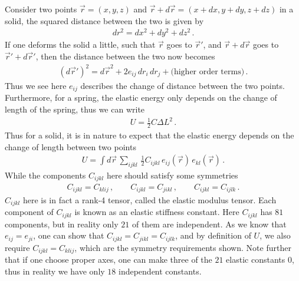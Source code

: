 \documentclass[11pt, onesided]{book}
\theoremstyle{break}
\theoremstyle{break}
\begin{document}
Consider two points $\vec{r} = (x,y,z)$ and $\vec{r}+d\vec{r} = (x+ dx, y + dy, z+dz)$ in a solid, the squared distance between the two is given by
\begin{align*}
dr^2 = dx^2 + dy^2 + dz^2\,.
\end{align*}
If one deforms the solid a little, such that $\vec{r}$ goes to $\vec{r}'$, and $\vec{r}+d\vec{r}$ goes to $\vec{r}'+d\vec{r}'$, then the distance between the two now becomes
\begin{align*}
(d\vec{r}')^2 = d\vec{r}^2 +2e_{ij}\,dr_i\, dr_j + \text{(higher order terms)}\,.
\end{align*}
Thus we see here $e_{ij}$ describes the change of distance between the two points. Furthermore, for a spring, the elastic energy only depends on the change of length of the spring, thus we can write
\begin{align*}
U = \frac{1}{2}C\Delta L^2\,.
\end{align*}
Thus for a solid, it is in nature to expect that the elastic energy depends on the change of length between two points
\begin{align*}
U = \int d\vec{r}\,\sum_{ijkl}\,\frac{1}{2}C_{ijkl}\,e_{ij}(\vec{r})\, e_{kl}(\vec{r})\,.
\end{align*}
While the components $C_{ijkl}$ here should satisfy some symmetries
\begin{align*}
C_{ijkl} = C_{klij}\,,\qquad
C_{ijkl} = C_{jikl}\,,\qquad
C_{ijkl} = C_{ijlk}\,.
\end{align*}
$C_{ijkl}$ here is in fact a rank-4 tensor, called the elastic modulus tensor. Each component of $C_{ijkl}$ is known as an elastic stiffness constant. Here $C_{ijkl}$ has $81$ components, but in reality only $21$ of them are independent. As we know that $e_{ij} = e_{ji}$, one can show that $C_{ijkl} = C_{jikl} = C_{ijlk}$, and by definition of $U$, we also require $C_{ijkl}= C_{klij}$, which are the symmetry requirements shown. Note further that if one choose proper axes, one can make three of the $21$ elastic constants $0$, thus in reality we have only $18$ independent constants.\\
\end{document}
